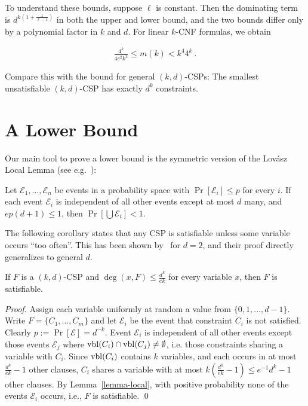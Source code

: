 \documentclass[envcountsect, envcountsame]{llncs}
\newcommand{\vbl}{\ensuremath{{\rm vbl}}}
\begin{document}
To understand these bounds, suppose $\ell$ is constant.
Then the dominating term is $d^{k(1+{\frac{1}{\ell-1}})}$ in both the
upper and lower bound, and the two bounds differ only by a polynomial
factor in $k$ and $d$.  For linear $k$-CNF formulas, we obtain

\begin{eqnarray}
  \frac{4^k}{4e^2k^3} \leq m(k) < k^4 4^k \ .
\end{eqnarray}

Compare this with the bound for general $(k,d)$-CSPs: The smallest
unsatisfiable $(k,d)$-CSP has exactly $d^k$ constraints. 


\section{A Lower Bound}
\label{section-lower}

Our main tool to prove a lower bound is the symmetric version of the
Lov\'asz Local Lemma (see e.g.~\cite{AS00}):

\begin{lemma}
  Let $\mathcal{E}_1,\dots,\mathcal{E}_n$ be events in a probability
  space with $\Pr[\mathcal{E}_i] \leq p$ for every $i$. If each event
  $\mathcal{E}_i$ is independent of all other events except at most
  $d$ many, and $ep(d+1) \leq 1$, then $\Pr[\bigcup \mathcal{E}_i] < 1$.
  \label{lemma-local}
\end{lemma}

The following corollary states that any CSP is satisfiable unless some
variable occurs ``too often''. This has been shown by~\cite{KST93} for
$d=2$, and their proof directly generalizes to general $d$.

\begin{corollary}
  If $F$ is a $(k,d)$-CSP and $\deg(x,F) \leq \frac{d^k}{ek}$
  for every variable $x$, then $F$ is satisfiable.
  \label{low-deg}
\end{corollary}

\begin{proof}
  Assign each variable uniformly at random a value from
  $\{0,1,\dots,d-1\}$.  Write $F = \{C_1,\dots,C_m\}$ and let
  $\mathcal{E}_i$ be the event that constraint $C_i$ is not satisfied.
  Clearly $p:= \Pr[\mathcal{E}] = d^{-k}$.  Event $\mathcal{E}_i$ is
  independent of all other events except those events $\mathcal{E}_j$
  where $\vbl(C_i) \cap \vbl(C_j) \ne \emptyset$, i.e. those
  constraints sharing a variable with $C_i$. Since $\vbl(C_i)$
  contains $k$ variables, and each occurs in at most
  $\frac{d^k}{ek}-1$ other clauses, $C_i$ shares a variable with at
  most $k\left(\frac{d^k}{ek}-1\right) \leq e^{-1}d^k-1$ other
  clauses. By Lemma~\ref{lemma-local}, with positive probability none
  of the events $\mathcal{E}_i$ occurs, i.e., $F$ is satisfiable.
  \qed
\end{proof}
\end{document}
